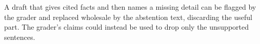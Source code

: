 \begin{finding}
A draft that gives cited facts and then names a missing detail can be flagged  by the grader and replaced wholesale by the abstention text, discarding the useful part. The grader's claims could instead be used to drop only the unsupported sentences.
\end{finding}
